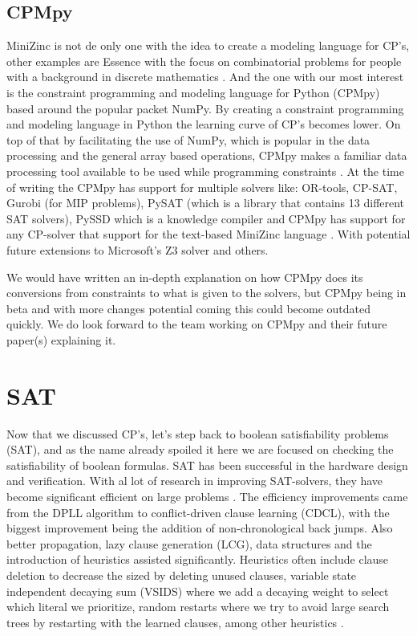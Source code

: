\subsection{CPMpy}
\label{CP:CPMpy}
MiniZinc is not de only one with the idea to create a modeling language for CP's, other examples are Essence with the focus on combinatorial problems for people with a background in discrete mathematics \cite{70frisch2008essence}.
And the one with our most interest is the constraint programming and modeling language for Python (CPMpy) based around the popular packet NumPy. By creating a constraint programming and modeling language in Python the learning curve of CP's becomes lower. On top of that by facilitating the use of NumPy, which is popular in the data processing and the general array based operations, CPMpy makes a familiar data processing tool available to be used while programming constraints \cite{17guns2019increasing}.
At the time of writing the CPMpy has support for multiple solvers like: OR-tools, CP-SAT, Gurobi (for MIP problems), PySAT (which is a library that contains 13 different SAT solvers), PySSD which is a knowledge compiler  and CPMpy has support for any CP-solver that support for the text-based MiniZinc language \cite{CPMpyDoc, CPMpyGithub}. With potential future extensions to Microsoft's Z3 solver and others.

We would have written an in-depth explanation on how CPMpy does its conversions from constraints to what is given to the solvers, but CPMpy being in beta and with more changes potential coming this could become outdated quickly. We do look forward to the team working on CPMpy and their future paper(s) explaining it.

\section{SAT}
\label{CS:SAT}
Now that we discussed CP's, let's step back to boolean satisfiability problems (SAT), and as the name already spoiled it here we are focused on checking the satisfiability of boolean formulas. SAT has been successful in the hardware design and verification. With al lot of research in improving SAT-solvers, they have become significant efficient on large problems \cite{56bardin2019bringing}.
The efficiency improvements came from the DPLL algorithm to conflict-driven clause learning (CDCL), with the biggest improvement being the addition of non-chronological back jumps. Also better propagation, lazy clause generation (LCG), data structures and the introduction of heuristics assisted significantly. Heuristics often include clause deletion to decrease the sized by deleting unused clauses, variable state independent decaying sum (VSIDS) where we add a decaying weight to select which literal we prioritize, random restarts where we try to avoid large search trees by restarting with the learned clauses, among other heuristics \cite{61MCSMarcDenecker, 60katebi2011empirical, 67stuckey2010lazyClauseGeneration}.


